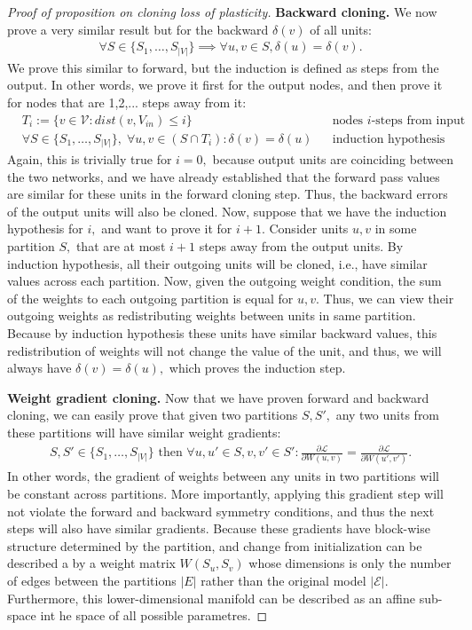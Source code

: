 \documentclass{article}
\newcommand{\Loss}{\mathcal{L}}
\begin{document}
\begin{proof}[Proof of proposition on cloning loss of plasticity]
    \textbf{Backward cloning.} We now prove a very similar result but for the backward $\delta(v)$ of all units:
        \begin{align*}
        \forall S \in \{S_1,\dots,S_{|V|}\} \implies \forall u,v \in S, \delta(u) = \delta(v). 
    \end{align*}
    We prove this similar to forward, but the induction is defined as steps from the output. In other words, we prove it first for the output nodes, and then prove it for nodes that are 1,2,... steps away from it: 
        \begin{align*}
        &T_i:= \{v\in \mathcal{V}: dist(v,V_{in}) \le i\} && \text{nodes $i$-steps from input}\\
        &\forall S \in \{S_1,\dots,S_{|V|}\}, \; \forall u,v \in (S\cap T_i): \delta(v) = \delta(u)  && \text{induction hypothesis}
    \end{align*}
    Again, this is trivially true for $i=0,$ because output units are coinciding between the two networks, and we have already established that the forward pass values are similar for these units in the forward cloning step. Thus, the backward errors of the output units will also be cloned. Now, suppose that we have the induction hypothesis for $i,$ and want to prove it for $i+1.$ Consider units $u,v$ in some partition $S,$ that are at most $i+1$ steps away from the output units. By induction hypothesis, all their outgoing units will be cloned, i.e., have similar values across each partition. Now, given the outgoing weight condition, the sum of the weights to each outgoing partition is equal for $u,v.$ Thus, we can view their outgoing weights as redistributing weights between units in same partition. Because by induction hypothesis these units have similar backward values, this redistribution of weights will not change the value of the unit, and thus, we will always have $\delta(v) = \delta(u),$ which proves the induction step.

    \textbf{Weight gradient cloning.} Now that we have proven forward and backward cloning, we can easily prove that given two partitions $S, S',$ any two units from these partitions will have similar weight gradients:
    \begin{align*}
        S,S' \in \{S_1,\dots, S_{|V|}\} \text{ then } \forall u,u' \in S, v,v'\in S': \frac{\partial \Loss}{\partial W(u,v)}=\frac{\partial \Loss}{\partial W(u',v')}.
    \end{align*}
    In other words, the gradient of weights between any units in two partitions will be constant across partitions. More importantly, applying this gradient step will not violate the forward and backward symmetry conditions, and thus the next steps will also have similar gradients. Because these gradients have block-wise structure determined by the partition, and change from initialization can be described a by a weight matrix $W(S_u,S_v)$ whose dimensions is only the number of edges between the partitions $|E|$ rather than the original model $|\mathcal{E}|$. Furthermore, this lower-dimensional manifold can be described as an affine sub-space int he space of all possible parametres. 
\end{proof}
\end{document}
